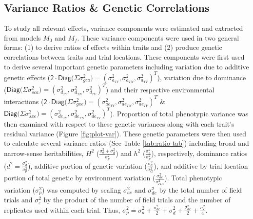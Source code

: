 \begin{refsection}
\subsection{Variance Ratios \& Genetic Correlations}\label{variance-ratios-genetic-correlations}

To study all relevant effects, variance components were estimated and extracted from models \(M_0\) and \(M_f\). These variance components were used in two general forms: (1) to derive ratios of effects within traits and (2) produce genetic correlations between traits and trial locations. These components were first used to derive several important genetic parameters including variation due to additive genetic effects (\(\mathsf{ 2\cdot Diag(\Sigma} \sigma^2_{gca}\mathsf{)}=(\sigma^2_{a_{TY}},\sigma^2_{a_{TN}},\sigma^2_{a_{TV}})^T\)), variation due to dominance (\(\mathsf{ Diag(\Sigma} \sigma^2_{sca}\mathsf{)}=(\sigma^2_{d_{TY}},\sigma^2_{d_{TN}},\sigma^2_{d_{TV}})^T\)) and their respective environmental interactions (\(\mathsf{ 2\cdot Diag(\Sigma}\sigma^2_{gxe}\mathsf{)}=(\sigma^2_{ae_{TY}},\sigma^2_{ae_{TN}},\sigma^2_{ae_{TV}})^T\) \& \(\mathsf{ Diag(\Sigma}\sigma^2_{sxe}\mathsf{)}=(\sigma^2_{de_{TY}},\sigma^2_{de_{TN}},\sigma^2_{de_{TV}})^T\)). Proportion of total phenotypic variance was then examined with respect to these genetic variances along with each trait's residual variance (Figure \ref{fig:plot-var}). These genetic parameters were then used to calculate several variance ratios (See Table \ref{tab:ratio-tab}) including broad and narrow-sense heritabilities, \(H^2\) (\(\frac{\sigma^2_{a}+\sigma^2_{d}}{\sigma^2_p}\)) and \(h^2\) (\(\frac{\sigma^2_{a}}{\sigma^2_p}\)), respectively, dominance ratios (\(d^2 =\frac{\sigma^2_{d}}{\sigma^2_p}\)), additive portion of genetic variation (\(\frac{\sigma^2_{a}}{\sigma^2_G}\)), and additive by trial location portion of total genetic by environment variation (\(\frac{\sigma^2_{ae}}{\sigma^2_{GE}}\)). Total phenotypic variation (\(\sigma^2_p\)) was computed by scaling \(\sigma^2_{ae}\) and \(\sigma^2_{de}\) by the total number of field trials and \(\sigma^2_{\varepsilon}\) by the product of the number of field trials and the number of replicates used within each trial. Thus, \(\sigma^2_p =\sigma^2_{a}+\frac{\sigma^2_{ae}}{2}+\sigma^2_{d} +\frac{\sigma^2_{de}}{2} + \frac{\sigma^2_{\varepsilon}}{4}\).


\end{refsection}
